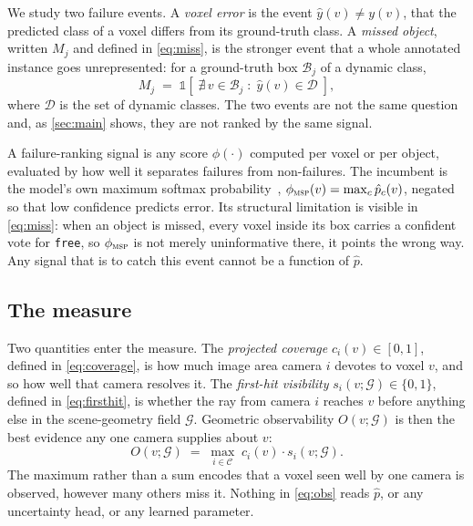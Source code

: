 \documentclass[10pt,twocolumn,letterpaper]{article}
\begin{document}
We study two failure events. A \emph{voxel error} is the event
$\hat{y}(v)\neq y(v)$, that the predicted class of a voxel differs from its
ground-truth class. A \emph{missed object}, written $M_j$ and defined in
\cref{eq:miss}, is the stronger event that a whole annotated instance goes
unrepresented: for a ground-truth box $\mathcal{B}_j$ of a dynamic class,
\begin{equation}
M_j \;=\; \mathbb{1}\!\left[\;\nexists\, v \in \mathcal{B}_j
   \;:\; \hat{y}(v) \in \mathcal{D} \;\right],
\label{eq:miss}
\end{equation}
where $\mathcal{D}$ is the set of dynamic classes. The two events are not
the same question and, as \cref{sec:main} shows, they are not ranked by
the same signal.

A failure-ranking signal is any score $\phi(\cdot)$ computed per voxel or
per object, evaluated by how well it separates failures from non-failures.
The incumbent is the model's own maximum softmax
probability~\cite{hendrycks2017msp}, $\phi_{\textsc{msp}}(v) =
\max_c \hat{p}_c(v)$, negated so that low confidence predicts error. Its
structural limitation is visible in \cref{eq:miss}: when an object is
missed, every voxel inside its box carries a confident vote for
\texttt{free}, so $\phi_{\textsc{msp}}$ is not merely uninformative there,
it points the wrong way. Any signal that is to catch this event cannot be
a function of $\hat{p}$.

\subsection{The measure}
\label{sec:defn}
Two quantities enter the measure. The \emph{projected coverage}
$c_i(v)\in[0,1]$, defined in \cref{eq:coverage}, is how much image area camera
$i$ devotes to voxel $v$, and so how well that camera resolves it. The
\emph{first-hit visibility} $s_i(v;\mathcal{G})\in\{0,1\}$, defined in
\cref{eq:firsthit}, is whether the ray from camera $i$ reaches $v$ before
anything else in the scene-geometry field $\mathcal{G}$. Geometric
observability $O(v;\mathcal{G})$ is then the best evidence any one camera
supplies about $v$:
\begin{equation}
O(v;\mathcal{G}) \;=\; \max_{i \in \mathcal{C}} \; c_i(v)\cdot
   s_i(v;\mathcal{G}).
\label{eq:obs}
\end{equation}
The maximum rather than a sum encodes that a voxel seen well by one camera
is observed, however many others miss it. Nothing in \cref{eq:obs} reads
$\hat{p}$, or any uncertainty head, or any learned parameter.
\end{document}
